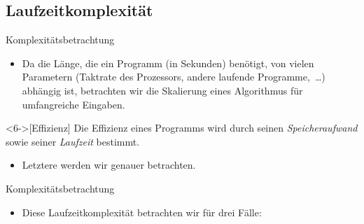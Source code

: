 \subsection{Laufzeitkomplexität}
\begin{frame}{Komplexitätsbetrachtung}
    \begin{itemize}[<+(1)->]
        \widei
        \item Da die Länge, die ein Programm (in Sekunden) benötigt,\pause{} von vielen Parametern\pause{} (Taktrate des Prozessors, andere laufende Programme,~\ldots) abhängig ist,\pause{} betrachten wir die Skalierung eines Algorithmus für umfangreiche Eingaben.
    \end{itemize}
    \begin{definition}<6->[Effizienz]
        \pause{}Die Effizienz eines Programms wird durch seinen \emph{Speicheraufwand} sowie seiner \emph{Laufzeit} bestimmt.
    \end{definition}
    \begin{itemize}[<+(1)->]
        \widei
        \item<8-> Letztere werden wir genauer betrachten. 
    \end{itemize}
\end{frame}

\begin{frame}{Komplexitätsbetrachtung}
    \begin{itemize}[<+(1)->]
        \widei
        \item Diese Laufzeitkomplexität betrachten wir für drei Fälle: 
    \end{itemize}
\end{frame}

